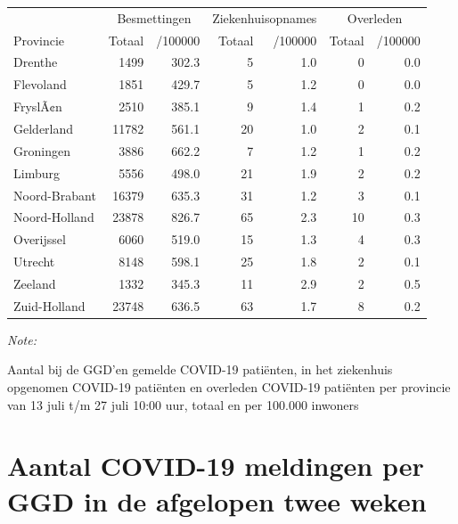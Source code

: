 \documentclass[
  english,
  man,floatsintext]{apa6}
\begin{document}
\begin{table}
\centering
\begin{threeparttable}
\begin{tabular}{lrrrrrr}
\toprule
\multicolumn{1}{c}{ } & \multicolumn{2}{c}{Besmettingen} & \multicolumn{2}{c}{Ziekenhuisopnames} & \multicolumn{2}{c}{Overleden} \\
\cmidrule(l{3pt}r{3pt}){2-3} \cmidrule(l{3pt}r{3pt}){4-5} \cmidrule(l{3pt}r{3pt}){6-7}
Provincie & Totaal & /100000 & Totaal & /100000 & Totaal & /100000\\
\midrule
Drenthe & 1499 & 302.3 & 5 & 1.0 & 0 & 0.0\\
Flevoland & 1851 & 429.7 & 5 & 1.2 & 0 & 0.0\\
FryslÃ¢n & 2510 & 385.1 & 9 & 1.4 & 1 & 0.2\\
Gelderland & 11782 & 561.1 & 20 & 1.0 & 2 & 0.1\\
Groningen & 3886 & 662.2 & 7 & 1.2 & 1 & 0.2\\
Limburg & 5556 & 498.0 & 21 & 1.9 & 2 & 0.2\\
Noord-Brabant & 16379 & 635.3 & 31 & 1.2 & 3 & 0.1\\
Noord-Holland & 23878 & 826.7 & 65 & 2.3 & 10 & 0.3\\
Overijssel & 6060 & 519.0 & 15 & 1.3 & 4 & 0.3\\
Utrecht & 8148 & 598.1 & 25 & 1.8 & 2 & 0.1\\
Zeeland & 1332 & 345.3 & 11 & 2.9 & 2 & 0.5\\
Zuid-Holland & 23748 & 636.5 & 63 & 1.7 & 8 & 0.2\\
\bottomrule
\end{tabular}
\begin{tablenotes}
\item \textit{Note: } 
\item Aantal bij de GGD’en gemelde COVID-19 patiënten, in het ziekenhuis opgenomen COVID-19 patiënten en overleden COVID-19 patiënten per provincie van 13 juli t/m 27 juli 10:00 uur, totaal en per 100.000 inwoners
\end{tablenotes}
\end{threeparttable}
\end{table}

\newpage

\hypertarget{aantal-covid-19-meldingen-per-ggd-in-de-afgelopen-twee-weken}{%
\section{Aantal COVID-19 meldingen per GGD in de afgelopen twee weken}\label{aantal-covid-19-meldingen-per-ggd-in-de-afgelopen-twee-weken}}
\end{document}
